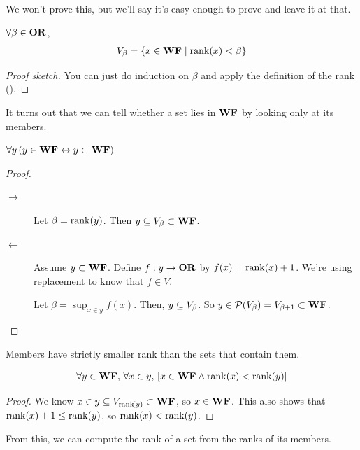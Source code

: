 We won't prove this, but we'll say it's easy enough to prove and leave it at that.

\begin{boxproposition}
    $\forall \beta \in \mathbf{OR}$,
    \begin{align*}
        V_{\beta} = \left\{ x \in \mathbf{WF} \; \middle\vert \; \operatorname{rank}\!\left( x \right) < \beta \right\}
    \end{align*}
\end{boxproposition}
\begin{proof}[Proof sketch]
    You can just do induction on $\beta$ and apply the definition of the rank ().
\end{proof}

It turns out that we can tell whether a set lies in $\mathbf{WF}$ by looking only at its members.

\begin{boxproposition}
    $\forall y \left( y \in \mathbf{WF} \leftrightarrow y \subset \mathbf{WF} \right)$
\end{boxproposition}
\begin{proof}\hfill
    \begin{description}
        \item[$\to$] Let $\beta = \operatorname{rank}\!\left( y \right)$. Then $y \subseteq V_{\beta} \subset \mathbf{WF}$.
        \item[$\leftarrow$] Assume $y \subset \mathbf{WF}$. Define $f : y \to \mathbf{OR}$ by $f(x) = \operatorname{rank}\!\left( x \right) + 1$. We're using replacement to know that $f \in V$.

        Let $\beta = \sup_{x \in y}{f(x)}$. Then, $y \subseteq V_{\beta}$. So $y \in \mathcal{P}\!\left( V_{\beta} \right) = V_{\beta + 1} \subset \mathbf{WF}$.
    \end{description}
\end{proof}

Members have strictly smaller rank than the sets that contain them.

\begin{boxproposition}\label{Ch1:Prop:Rank_Of_Members}
    \begin{align*}
        \forall y \in \mathbf{WF},\, \forall x \in y,\, \left[ x \in \mathbf{WF} \land \operatorname{rank}\!\left( x \right) < \operatorname{rank}\!\left( y \right) \right]
    \end{align*}
\end{boxproposition}
\begin{proof}
    We know $x \in y \subseteq V_{\operatorname{rank}\!\left( y \right)} \subset \mathbf{WF}$, so $x \in \mathbf{WF}$. This also shows that $\operatorname{rank}\!\left( x \right) + 1 \leq \operatorname{rank}\!\left( y \right)$, so $\operatorname{rank}\!\left( x \right) < \operatorname{rank}\!\left( y \right)$.
\end{proof}

From this, we can compute the rank of a set from the ranks of its members.

